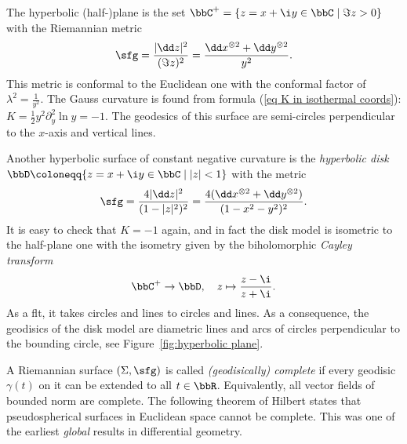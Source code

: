 \begin{example}
    The hyperbolic (half-)plane is the set $\bbC^+=\{z=x+\i y\in\bbC\mid \Im z>0\}$ with the Riemannian metric 
    \[\sfg=\frac{|\dd z|^2}{(\Im z)^2}=\frac{\dd x^{\otimes 2}+\dd y^{\otimes 2}}{y^2}.\]
    This metric is conformal to the Euclidean one with the conformal factor of $\lambda^2=\frac{1}{y^2}$. The Gauss curvature is found from formula (\ref{eq K in isothermal coords}): $K=\frac12y^2\partial_y^2\ln y=-1$. The geodesics of this surface are semi-circles perpendicular to the $x$-axis and vertical lines.
    
    Another hyperbolic surface of constant negative curvature is the \emph{hyperbolic disk}  $\bbD\coloneqq \{z=x+\i y\in\bbC \mid |z|<1\}$ with the metric 
    \[\sfg=\frac{4|\dd z|^2}{(1-|z|^2)^2}=\frac{4(\dd x^{\otimes 2}+\dd y^{\otimes 2})}{(1-x^2-y^2)^2}.\]
    It is easy to check that $K=-1$ again, and in fact the disk model is isometric to the half-plane one with the isometry given by the biholomorphic \emph{Cayley transform} 
    \[\bbC^+\to \bbD,\quad z\mapsto \frac{z-\i }{z+\i}.\]
    As a \gls{flt}, it takes circles and lines to circles and lines. As a consequence, the geodisics of the disk model are diametric lines and arcs of circles perpendicular to the bounding circle, see Figure~\ref{fig:hyperbolic plane}.
\end{example}


A Riemannian surface $(\Sigma,\sfg)$ is called \emph{(geodisically) complete} if every geodisic $\gamma(t)$ on it can be extended to all $t\in\bbR$. Equivalently, all vector fields of bounded norm are complete. The following theorem of Hilbert states that pseudospherical surfaces in Euclidean space cannot be complete. This was one of the earliest \emph{global} results in differential geometry. 

